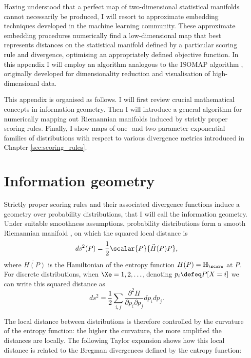 Having understood that a perfect map of two-dimensional statistical manifolds cannot necessarily be produced, I will resort to approximate embedding techniques developed in the machine learning community. These approximate embedding procedures numerically find a low-dimensional map that best represents distances on the statistical manifold defined by a particular scoring rule and divergence, optimising an appropriately defined objective function. In this appendix I will employ an algorithm analogous to the ISOMAP algorithm \citep{Tenenbaum2000}, originally developed for dimensionality reduction and visualisation of high-dimensional data.

This appendix is organised as follows. I will first review crucial mathematical concepts in information geometry. Then I will introduce a general algorithm for numerically mapping out Riemannian manifolds induced by strictly proper scoring rules. Finally, I show maps of one- and two-parameter exponential families of distributions with respect to various divergence metrics introduced in Chapter \ref{sec:scoring_rules}.

\section{Information geometry}

Strictly proper scoring rules and their associated divergence functions induce a geometry over probability distributions, that I will call the information geometry. Under suitable smoothness assumptions, probability distributions form a smooth Riemannian manifold \citep{Dawid2007,Amari2010}, on which the squared local distance is
%
\begin{equation}
	ds^2(P) = \frac{1}{2} \scalar{P}{\ddot{H}(P)P},
\end{equation}
%
where $\ddot{H(P)}$ is the Hamiltonian of the entropy function $H(P) = \mathbb{H}_{\score}$ at $P$. For discrete distributions, when $\Xe={1,2,\ldots}$, denoting $p_i\defeq P[X=i]$ we can write this squared distance as
%
\begin{equation}
	ds^2 = \frac{1}{2} \sum_{i,j} \frac{\partial^2 H}{\partial p_i\partial p_j} dp_{i} dp_{j}.
\end{equation}

The local distance between distributions is therefore controlled by the curvature of the entropy function: the higher the curvature, the more amplified the distances are locally. The following Taylor expansion shows how this local distance is related to the Bregman divergences defined by the entropy function:

